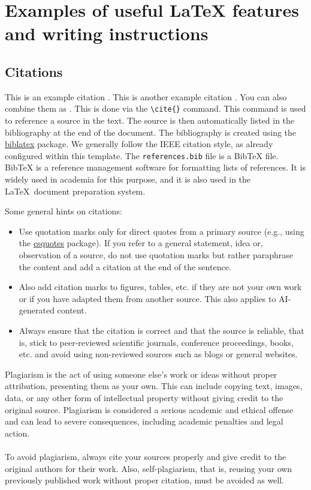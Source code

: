\chapter{Examples of useful LaTeX features and writing instructions} 
\label{cha:hints}

\section{Citations}
\label{sec:citations}
This is an example citation \cite{WaBo2016}. This is another example citation \cite{wallscheid2014real}. You can also combine them as \cite{WaBo2016,wallscheid2014real}. This is done via the \verb|\cite{}| command. This command is used to reference a source in the text. The source is then automatically listed in the bibliography at the end of the document. The bibliography is created using the \href{https://ctan.org/pkg/biblatex}{biblatex} package. We generally follow the IEEE citation style, as already configured within this template. The \texttt{references.bib} file is a BibTeX file. BibTeX is a reference management software for formatting lists of references. It is widely used in academia for this purpose, and it is also used in the \LaTeX\ document preparation system.

Some general hints on citations:
\begin{itemize}
	\item Use quotation marks only for direct quotes from a primary source (e.g., using the \href{https://ctan.org/pkg/csquotes}{csquotes} package). If you refer to a general statement, idea or, observation of a source, do not use quotation marks but rather paraphrase the content and add a citation at the end of the sentence.
	\item Also add citation marks to figures, tables, etc. if they are not your own work or if you have adapted them from another source. This also applies to AI-generated content.
	\item Always ensure that the citation is correct and that the source is reliable, that is, stick to peer-reviewed scientific journals, conference proceedings, books, etc. and avoid using non-reviewed sources such as blogs or general websites.
\end{itemize}
\begin{infobox}[][Plagiarism]
Plagiarism is the act of using someone else's work or ideas without proper attribution, presenting them as your own. This can include copying text, images, data, or any other form of intellectual property without giving credit to the original source. Plagiarism is considered a serious academic and ethical offense and can lead to severe consequences, including academic penalties and legal action.\\
\\
To avoid plagiarism, always cite your sources properly and give credit to the original authors for their work. Also, self-plagiarism, that is, reusing your own previously published work without proper citation, must be avoided as well.
\end{infobox}



